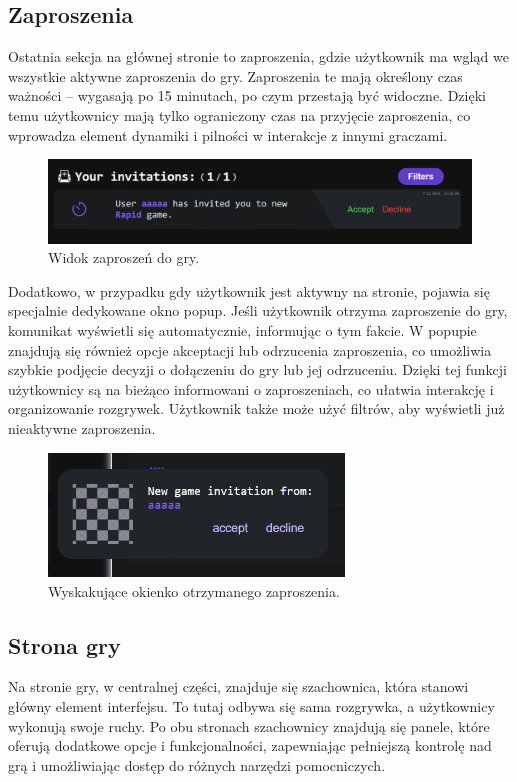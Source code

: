 \documentclass[12pt,a4paper]{article}
\begin{document}
\newpage
\subsection{Zaproszenia}
Ostatnia sekcja na głównej stronie to zaproszenia, gdzie użytkownik ma wgląd we wszystkie aktywne zaproszenia do gry. Zaproszenia te mają określony czas ważności – wygasają po 15 minutach, po czym przestają być widoczne. Dzięki temu użytkownicy mają tylko ograniczony czas na przyjęcie zaproszenia, co wprowadza element dynamiki i pilności w interakcje z innymi graczami.

\begin{figure}[h!]
    \centering
    \includegraphics[width=1\textwidth]{zdj/ins_min_inv_card.png}
    \caption{Widok zaproszeń do gry.}
\end{figure}

Dodatkowo, w przypadku gdy użytkownik jest aktywny na stronie, pojawia się specjalnie dedykowane okno popup. Jeśli użytkownik otrzyma zaproszenie do gry, komunikat wyświetli się automatycznie, informując o tym fakcie. W popupie znajdują się również opcje akceptacji lub odrzucenia zaproszenia, co umożliwia szybkie podjęcie decyzji o dołączeniu do gry lub jej odrzuceniu. Dzięki tej funkcji użytkownicy są na bieżąco informowani o zaproszeniach, co ułatwia interakcję i organizowanie rozgrywek. Użytkownik także może użyć filtrów, aby wyświetli już nieaktywne zaproszenia.

\begin{figure}[h!]
    \centering
    \includegraphics[width=0.7\textwidth]{zdj/ins_min_inv_popup.png}
    \caption{Wyskakujące okienko otrzymanego zaproszenia.}
\end{figure}

\newpage
\subsection{Strona gry}
Na stronie gry, w centralnej części, znajduje się szachownica, która stanowi główny element interfejsu. To tutaj odbywa się sama rozgrywka, a użytkownicy wykonują swoje ruchy. Po obu stronach szachownicy znajdują się panele, które oferują dodatkowe opcje i funkcjonalności, zapewniając pełniejszą kontrolę nad grą i umożliwiając dostęp do różnych narzędzi pomocniczych.
\end{document}
